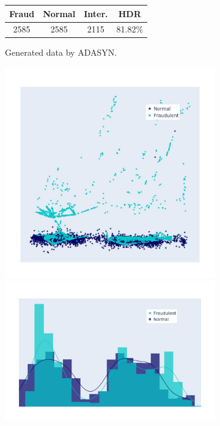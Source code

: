 \begin{figure}[h!]
\begin{subfigure}[]{0.3\linewidth}
		\begin{tabular}{c|c|c|c}
			Fraud & Normal & Inter. & HDR  \\
			\hline
			2585  & 2585  & 2115 & 81.82\(\%\) \\
		\end{tabular}
		\caption{Generated data by ADASYN. }
		\label{fig:ADASYN_hist}
	\end{subfigure}
	\hspace{0.1em}%
	\begin{subfigure}[]{0.3\linewidth}	
		\includegraphics[width=\linewidth,trim=40 40 40 40,clip]{Figures/creditcard/PCA/BorderlineSMOTE-data-run-0-0}
		\includegraphics[width=\linewidth,trim=40 40 40 40,clip]{Figures/creditcard/PCA/BorderlineSMOTE-data-run-0-0_DIST}

\end{subfigure}
\end{figure}

